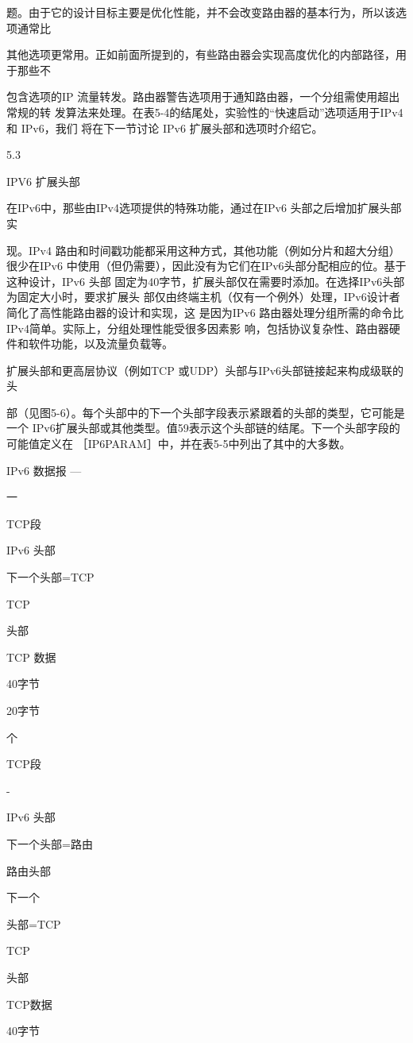 题。由于它的设计目标主要是优化性能，并不会改变路由器的基本行为，所以该选项通常比

其他选项更常用。正如前面所提到的，有些路由器会实现高度优化的内部路径，用于那些不

包含选项的IP 流量转发。路由器警告选项用于通知路由器，一个分组需使用超出常规的转
发算法来处理。在表5-4的结尾处，实验性的“快速启动”选项适用于IPv4 和 IPv6，我们
将在下一节讨论 IPv6 扩展头部和选项时介绍它。

5.3

IPV6 扩展头部

在IPv6中，那些由IPv4选项提供的特殊功能，通过在IPv6 头部之后增加扩展头部实

现。IPv4 路由和时间戳功能都采用这种方式，其他功能（例如分片和超大分组）很少在IPv6
中使用（但仍需要），因此没有为它们在IPv6头部分配相应的位。基于这种设计，IPv6 头部
固定为40字节，扩展头部仅在需要时添加。在选择IPv6头部为固定大小时，要求扩展头
部仅由终端主机（仅有一个例外）处理，IPv6设计者简化了高性能路由器的设计和实现，这
是因为IPv6 路由器处理分组所需的命令比 IPv4简单。实际上，分组处理性能受很多因素影
响，包括协议复杂性、路由器硬件和软件功能，以及流量负载等。

扩展头部和更高层协议（例如TCP 或UDP）头部与IPv6头部链接起来构成级联的头

部（见图5-6）。每个头部中的下一个头部字段表示紧跟着的头部的类型，它可能是一个
IPv6扩展头部或其他类型。值59表示这个头部链的结尾。下一个头部字段的可能值定义在
［IP6PARAM］中，并在表5-5中列出了其中的大多数。

IPv6 数据报 —

一

TCP段

IPv6 头部

下一个头部=TCP

TCP

头部

TCP 数据

40字节

20字节

个

TCP段

-

IPv6 头部

下一个头部=路由

路由头部

下一个

头部=TCP

TCP

头部

TCP数据

40字节

